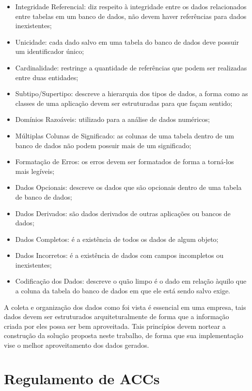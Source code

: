 \begin{itemize}
    \item Integridade Referencial: diz respeito à integridade entre os dados relacionados entre tabelas em um banco de dados, não devem haver referências para dados inexistentes;
    \item Unicidade: cada dado salvo em uma tabela do banco de dados deve possuir um identificador único;
    \item Cardinalidade: restringe a quantidade de referências que podem ser realizadas entre duas entidades;
    \item Subtipo/Supertipo: descreve a hierarquia dos tipos de dados, a forma como as classes de uma aplicação devem ser estruturadas para que façam sentido;
    \item Domínios Razoáveis: utilizado para a análise de dados numéricos;
    \item Múltiplas Colunas de Significado: as colunas de uma tabela dentro de um banco de dados não podem possuir mais de um significado;
    \item Formatação de Erros: os erros devem ser formatados de forma a torná-los mais legíveis;
    \item Dados Opcionais: descreve os dados que são opcionais dentro de uma tabela de banco de dados;
    \item Dados Derivados: são dados derivados de outras aplicações ou bancos de dados;
    \item Dados Completos: é a existência de todos os dados de algum objeto;
    \item Dados Incorretos: é a existência de dados com campos incompletos ou inexistentes;
    \item Codificação dos Dados: descreve o quão limpo é o dado em relação àquilo que a coluna da tabela do banco de dados em que ele está sendo salvo exige.
\end{itemize}

A coleta e organização dos dados como foi vista é essencial em uma empresa, tais dados devem ser estruturados arquiteturalmente de forma que a informação criada por eles possa ser bem aproveitada. Tais princípios devem nortear a construção da solução proposta neste trabalho, de forma que sua implementação vise o melhor aproveitamento dos dados gerados.

\section{Regulamento de ACCs}
\label{sec:regulamentoaccs}

